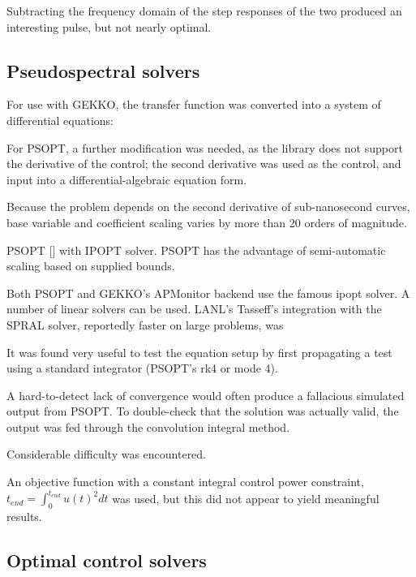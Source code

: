 \documentclass[fleqn,10pt]{paper}
\begin{document}
Subtracting the frequency domain of the step responses of the two produced an interesting pulse, but not nearly optimal.


\subsection*{Pseudospectral solvers}



For use with GEKKO, the transfer function was converted into a system of differential equations:

For PSOPT, a further modification was needed, as the library does not support the derivative of the control; the second derivative was used as the control, and input into a differential-algebraic equation form.

Because the problem depends on the second derivative of sub-nanosecond curves, base variable and coefficient scaling varies by more than 20 orders of magnitude. 

PSOPT [] with IPOPT\cite{implementation2006} solver. PSOPT has the advantage of semi-automatic scaling based on supplied bounds. 

Both PSOPT and GEKKO's APMonitor backend use the famous ipopt solver. A number of linear solvers can be used. LANL's Tasseff's integration with the SPRAL solver, reportedly faster on large problems, was 

It was found very useful to test the equation setup by first propagating a test using a standard integrator (PSOPT's rk4 or mode 4).

A hard-to-detect lack of convergence would often produce a fallacious simulated output from PSOPT. To double-check that the solution was actually valid, the output was fed through the convolution integral method.

Considerable difficulty was encountered. 

An objective function with a constant integral control power constraint, $t_{end} = \int_0^{t_{end}} u(t)^2 dt$ was used, but this did not appear to yield meaningful results.

\subsection*{Optimal control solvers}
\end{document}
